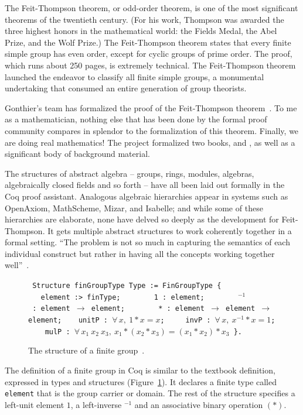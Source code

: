 \documentclass{llncs}
\begin{document}
The Feit-Thompson theorem, or odd-order theorem, is one of the most
significant theorems of the twentieth century.  (For his work,
Thompson was awarded the three highest honors in
the mathematical world: the Fields Medal, the Abel Prize, and the Wolf
Prize.)  The Feit-Thompson theorem states that every finite simple
group has even order, except for cyclic groups of prime order.  The
proof, which runs about 250 pages, is extremely technical.  The
Feit-Thompson theorem launched the endeavor to classify all finite
simple groups, a monumental undertaking that consumed an entire
generation of group theorists.


Gonthier's team has formalized the proof of the Feit-Thompson theorem~\cite{gon-FT}.
To me as a mathematician, nothing else that has been done by the formal
proof community compares in splendor to the formalization of this
theorem.  Finally, we are doing real mathematics!  The project
formalized two books, \cite{BG94} and \cite{P00}, as well as a significant
body of background material.

The structures of abstract algebra -- groups, rings, modules,
algebras, algebraically closed fields and so forth -- have all been
laid out formally in the Coq proof assistant.  Analogous algebraic
hierarchies appear in systems such as OpenAxiom, MathScheme, Mizar, and
Isabelle; and while some of these hierarchies are elaborate, none have
delved so deeply as the development for Feit-Thompson.
It gets multiple abstract structures to work coherently
together in a formal setting. ``The problem is not so much in capturing
the semantics of each individual construct but rather in having all
the concepts working together well''~\cite{gonMF}. 


\begin{figure}
{

\obeylines\tt
Structure~finGroupType~Type~:= FinGroupType \{
~~~element~:>~finType;
~~~~~~~1~:~element;
~~~~~~\hskip0.8mm ${}^{-1}$~:~element $\to$ element;
~~~~~~~*~:~element $\to$ element $\to$ element;
~~~unitP~:~$\forall\,x,~1*x = x$;
~~~~invP~:~$\forall\,x,~x^{-1} * x = 1$;
~~~~mulP~:~$\forall\,x_1~x_2~x_3,~ x_1 * (x_2 * x_3) = (x_1 * x_2) * x_3$
\}.

}
\caption{The structure of a finite group~\cite{gonMF}.}
\label{fig:group}
\end{figure}

The definition of a finite group in Coq is similar to the textbook definition,
expressed in types and structures (Figure~\ref{fig:group}).
It declares a finite type called {\tt element} that is the group
carrier or domain.  The rest of the structure specifies a left-unit
element $1$, a left-inverse ${}^{-1}$ and an associative binary
operation $( * )$.  
\end{document}
